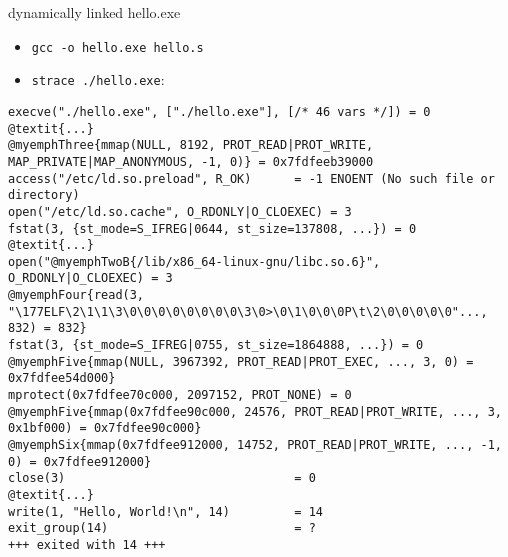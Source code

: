 \begin{frame}[fragile,label=straceDynamic]{dynamically linked hello.exe}
\begin{itemize}
\item \small{\tt gcc -o hello.exe hello.s}
\item \small{\tt strace ./hello.exe}:
\end{itemize}
\begin{Verbatim}[commandchars=@\{\},fontsize=\fontsize{8}{9}\selectfont]
execve("./hello.exe", ["./hello.exe"], [/* 46 vars */]) = 0
@textit{...}
@myemphThree{mmap(NULL, 8192, PROT_READ|PROT_WRITE, MAP_PRIVATE|MAP_ANONYMOUS, -1, 0)} = 0x7fdfeeb39000
access("/etc/ld.so.preload", R_OK)      = -1 ENOENT (No such file or directory)
open("/etc/ld.so.cache", O_RDONLY|O_CLOEXEC) = 3
fstat(3, {st_mode=S_IFREG|0644, st_size=137808, ...}) = 0
@textit{...}
open("@myemphTwoB{/lib/x86_64-linux-gnu/libc.so.6}", O_RDONLY|O_CLOEXEC) = 3
@myemphFour{read(3, "\177ELF\2\1\1\3\0\0\0\0\0\0\0\0\3\0>\0\1\0\0\0P\t\2\0\0\0\0\0"..., 832) = 832}
fstat(3, {st_mode=S_IFREG|0755, st_size=1864888, ...}) = 0
@myemphFive{mmap(NULL, 3967392, PROT_READ|PROT_EXEC, ..., 3, 0) = 0x7fdfee54d000}
mprotect(0x7fdfee70c000, 2097152, PROT_NONE) = 0
@myemphFive{mmap(0x7fdfee90c000, 24576, PROT_READ|PROT_WRITE, ..., 3, 0x1bf000) = 0x7fdfee90c000}
@myemphSix{mmap(0x7fdfee912000, 14752, PROT_READ|PROT_WRITE, ..., -1, 0) = 0x7fdfee912000}
close(3)                                = 0
@textit{...}
write(1, "Hello, World!\n", 14)         = 14
exit_group(14)                          = ?
+++ exited with 14 +++
\end{Verbatim}
\end{frame}

